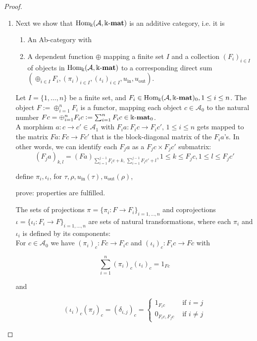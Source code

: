 \begin{proof}
\begin{enumerate}
\item Next we show that $\mathrm{Hom_{\Bbbk}}(\mathcal{A},\Bbbk\textnormal{-}\mathbf{mat})$ is an additive category, i.e. it is
\begin{enumerate}
\renewcommand{\labelenumii}{(\roman{enumii})}
\item An Ab-category with
\item A dependent function $\oplus$ mapping a finite set $I$ and a collection $(F_{i})_{i\in I}$ of objects in $\mathrm{Hom_{\Bbbk}}(\mathcal{A},\Bbbk\textnormal{-}\mathbf{mat})$
to a corresponding direct sum $( \oplus_{i\in I} F_{i}, (\pi_{i})_{i\in I}, (\iota_{i})_{i\in I}, u_{\mathrm{in}}, u_{\mathrm{out}} )$.
\end{enumerate}
\begin{subproof}[Proof of (ii)]
Let $I = \{1,\dots,n\}$ be a finite set, and $F_{i} \in \mathrm{Hom_{\Bbbk}}(\mathcal{A},\Bbbk\textnormal{-}\mathbf{mat})_{0}, 1\leq i\leq n$. The object $F := \oplus_{i=1}^{n} F_{i}$ is a functor, mapping
each object $c \in \mathcal{A}_{0}$ to the natural number $Fc = \oplus_{i=1}^{n} F_{i}c := \sum_{i=1}^{n} F_{i}c \in \Bbbk\textnormal{-}\mathbf{mat}_{0}$.\\
A morphism $a : c \rightarrow c' \in \mathcal{A}_{1}$ with $F_{i} a : F_{i} c \rightarrow F_{i} c', \, 1\leq i\leq n$ gets mapped to the matrix 
$F a : Fc \rightarrow Fc'$ that is the block-diagonal matrix of the $F_{i}a$'s.
In other words, we can identify each $F_{j}a$ as a $F_{j} c \times F_{j} c'$ submatrix:
\[
\left(F_{j}a\right)_{k,l} = \left(F a\right)_{\sum_{i=1}^{j-1} F_{i}c + k,\,\sum_{i=1}^{j-1} F_{i}c' + l},
1 \leq k \leq F_{j}c, 1 \leq l \leq F_{j}c'
\]

define $\pi_{i}, \iota_{i}$, for $\tau, \rho, u_{\mathrm{in}}(\tau), u_{\mathrm{out}}(\rho)$,

prove:
properties are fulfilled.

The sets of projections $\pi = \{ \pi_{i} : F \rightarrow F_{i} \}_{i = 1,\dots,n}$ and coprojections
$\iota = \{ \iota_{i} : F_{i} \rightarrow F \}_{i = 1,\dots,n}$ are sets of natural transformations,
where each $\pi_{i}$ and $\iota_{i}$ is defined by its components:\\
For $c \in \mathcal{A}_{0}$ we have $(\pi_{i})_{c} : Fc \rightarrow F_{i}c$ and $(\iota_{i})_{c} : F_{i}c \rightarrow Fc$ with\\
\begin{minipage}{.35\textwidth}
\[
\sum_{i=1}^{n} (\pi_{i})_{c} (\iota_{i})_{c} = 1_{Fc}
\]
\end{minipage}
\begin{minipage}{.1\textwidth}
and
\end{minipage}
\begin{minipage}{.55\textwidth}
\[
(\iota_{i})_{c}(\pi_{j})_{c} = (\delta_{i,j})_{c} = \begin{cases}
1_{F_{i}c} & \text{ if } i = j \\
0_{F_{i}c, F_{j}c} & \text{ if } i \neq j
\end{cases}
\]
\end{minipage}


\end{subproof}
\end{enumerate}
\end{proof}
